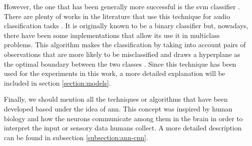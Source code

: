 	However, the one that has been generally more successful is the \acrfull{svm} classifier . There are plenty of works in the literature that use this technique for audio classification tasks \cite{Jiang2005} \cite{Geiger2013} \cite{Barchiesi2015}. It is originally known to be a binary classifier but, nowadays, there have been some implementations that allow its use it in multiclass problems. This algorithm makes the classification by taking into account pairs of observations that are more likely to be misclassified and draws a hyperplane as the optimal boundary between the two classes \cite{Fu2011}. Since this technique has been used for the experiments in this work, a more detailed explanation will be included in section \ref{section:models}.
	
	Finally, we should mention all the techniques or algorithms that have been developed based under the idea of \acrfull{ann}. This concept was inspired by human biology and how the neurons communicate among them in the brain in order to interpret the input or sensory data humans collect.  A more detailed description can be found in subsection \ref{subsection:ann-cnn}.
	

	


	
	
	
	

	
	
	
	
	
	
	
	